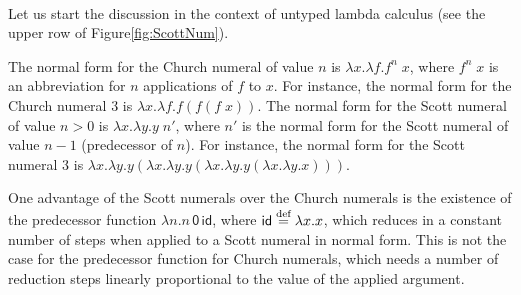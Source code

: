 \paragraph{}
Let us start the discussion in the context of untyped lambda calculus
(see the upper row of Figure\;\ref{fig:ScottNum}). 

The normal form for the Church numeral of value $n$ is
$\lambda x.\lambda f.f^n\;x$, where $f^n\;x$ is an abbreviation for
$n$ applications of $f$ to $x$. For instance, the normal form for
the Church numeral $3$ is $\lambda x.\lambda f.f(f(f\;x))$.
The normal form for the Scott numeral of value $n>0$ is
$\lambda x.\lambda y.y\;n'$, where $n'$ is the normal form for
the Scott numeral of value $n-1$ (\ie predecessor of $n$). For instance,
the normal form for the Scott numeral $3$ is
$\lambda x.\lambda y.
 y(\lambda x.\lambda y.
  y(\lambda x.\lambda y.
   y(\lambda x.\lambda y.x)))$.

One advantage of
the Scott numerals over the Church numerals is the existence of
the predecessor function $\lambda n.n\,\mathsf{0}\,\mathsf{id}$,
where $\mathsf{id}\stackrel{\text{def}}{=}\lambda x.x$, which reduces in a constant number of steps
when applied to a Scott numeral in normal form. This is not the case for
the predecessor function for Church numerals, which needs a number of reduction steps
linearly proportional to the value of the applied argument.

